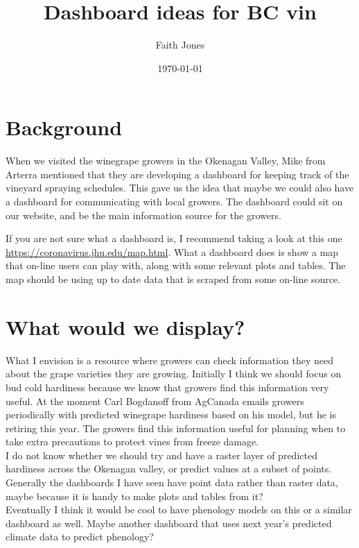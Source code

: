 \documentclass[11pt,letter]{article}
\title{Dashboard ideas for BC vin}
\date{\today}
\author{Faith Jones}
\begin{document}
\maketitle
\tableofcontents

\section{Background}

When we visited the winegrape growers in the Okenagan  Valley, Mike from Arterra mentioned that they are developing a dashboard for keeping track of the vineyard spraying schedules. This gave us the idea that maybe we could also have a dashboard for communicating with local growers. The dashboard could sit on our website, and be the main information source for the growers. 

If you are not sure what a dashboard is, I recommend taking a look at this one \url{https://coronavirus.jhu.edu/map.html}. What a dashboard does is show a map that on-line users can play with, along with some relevant plots and tables. The map should be using up to date data that is scraped from some on-line source.   

\section{What would we display?}
What I envision is a resource where growers can check information they need about the grape varieties they are growing. Initially I think we should focus on bud cold hardiness because we know that growers find this information very useful. At the moment Carl Bogdanoff from AgCanada emails growers periodically with predicted winegrape hardiness based on his model, but he is retiring this year. The growers find this information useful for planning when to take extra precautions to protect vines from freeze damage. \\

I do not know whether we should try and have a raster layer of predicted hardiness across the Okenagan valley, or predict values at a subset of points. Generally the dashboards I have seen have point data rather than raster data, maybe because it is handy to make plots and tables from it?\\

Eventually I think it would be cool to have phenology models on this or a similar dashboard as well. Maybe another dashboard that uses next year's predicted climate data to predict phenology? 
\end{document}

